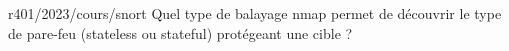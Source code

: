 \begin{question}{r401/2023/cours/snort}
  Quel type de balayage nmap permet de découvrir le type de pare-feu
  (stateless ou stateful) protégeant une cible ?
  \begin{reponseshoriz}
  \end{reponseshoriz}
\end{question}
